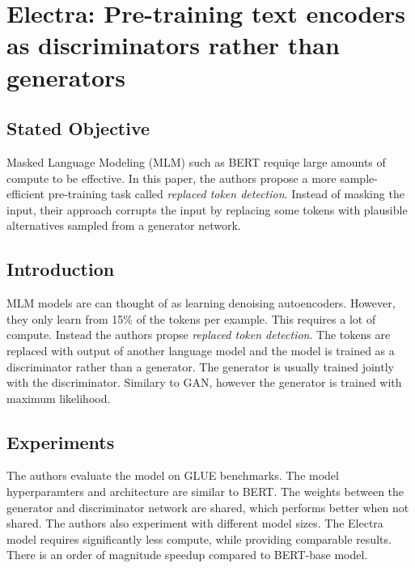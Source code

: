 \documentclass[12pt]{article}
\begin{document}
\clearpage
\section*{Electra: Pre-training text encoders
as discriminators rather than generators}

\subsection*{Stated Objective}

Masked Language Modeling (MLM) such as BERT requiqe large amounts of compute to be effective. In this paper, the authors propose a more sample-efficient pre-training task called \textit{replaced token detection}. Instead of masking the input, their approach corrupts the input by replacing some tokens with plausible alternatives sampled from a generator network.

\subsection*{Introduction}

MLM models are can thought of as learning denoising autoencoders. However, they only learn from 15\% of the tokens per example. This requires a lot of compute. Instead the authors propse \textit{replaced token detection}. The tokens are replaced with output of another language model and the model is trained as a discriminator rather than a generator. The generator is usually trained jointly with the discriminator. Similary to GAN, however the generator is trained with maximum likelihood.

\subsection*{Experiments}

The authors evaluate the model on GLUE benchmarks. The model hyperparamters and architecture are similar to BERT. The weights between the generator and discriminator network are shared, which performs better when not shared. The authors also experiment with different model sizes. The Electra model requires significantly less compute, while providing comparable results. There is an order of magnitude speedup compared to BERT-base model.
\end{document}
